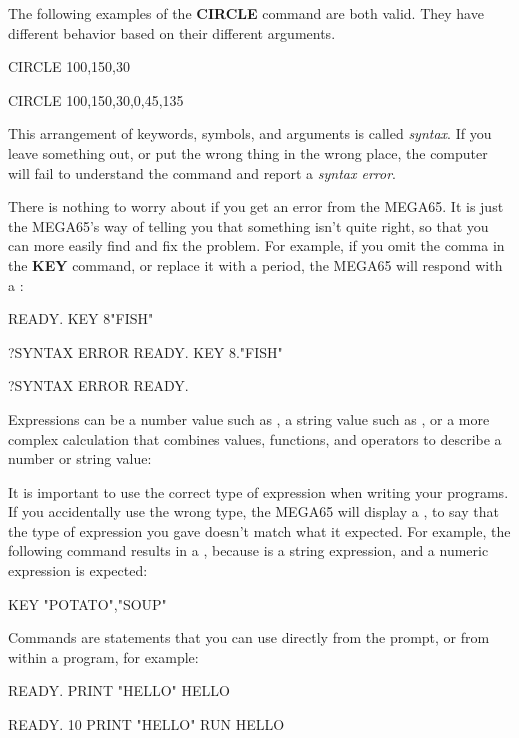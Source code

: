 The following examples of the {\bf CIRCLE} command are both valid. They have
different behavior based on their different arguments.

\begin{screencode}
CIRCLE 100,150,30

CIRCLE 100,150,30,0,45,135
\end{screencode}

This arrangement of keywords, symbols, and arguments is called {\em syntax}. If
you leave something out, or put the wrong thing in the wrong place, the computer
will fail to understand the command and report a {\em syntax error}.

There is nothing to worry about if you get an error from the MEGA65. It is just
the MEGA65's way of telling you that something isn't quite right, so that you can
more easily find and fix the problem. For example, if you omit the comma in the
{\bf KEY} command, or replace it with a period, the MEGA65 will respond with
a :

\newpage
\begin{screencode}
READY.
KEY 8"FISH"

?SYNTAX ERROR
READY.
KEY 8."FISH"

?SYNTAX ERROR
READY.
\end{screencode}

Expressions can be a number value such as , a string value such
as , or a more complex calculation that combines values,
functions, and operators to describe a number or string value:

It is important to use the correct type of expression when writing your programs.
If you accidentally use the wrong type, the MEGA65 will display a
, to say that the type of expression you gave
doesn't match what it expected. For example, the following command results in a
, because  is a string
expression, and a numeric expression is expected:

\begin{screencode}
KEY "POTATO","SOUP"
\end{screencode}

Commands are statements that you can use directly from the 
prompt, or from within a program, for example:

\begin{screencode}
READY.
PRINT "HELLO"
HELLO

READY.
10 PRINT "HELLO"
RUN
HELLO
\end{screencode}

